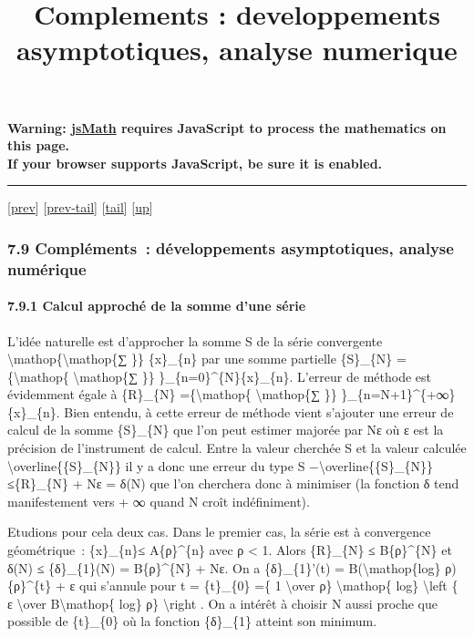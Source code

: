 \documentclass[]{article}
\title{Complements : developpements asymptotiques, analyse numerique}
\author{}
\date{}
\begin{document}
\maketitle

\textbf{Warning: \href{http://www.math.union.edu/locate/jsMath}{jsMath}
requires JavaScript to process the mathematics on this page.\\ If your
browser supports JavaScript, be sure it is enabled.}

\begin{center}\rule{3in}{0.4pt}\end{center}

{[}\href{coursse42.html}{prev}{]}
{[}\href{coursse42.html\#tailcoursse42.html}{prev-tail}{]}
{[}\hyperref[tailcoursse43.html]{tail}{]}
{[}\href{coursch8.html\#coursse43.html}{up}{]}

\subsubsection{7.9 Compléments~: développements asymptotiques, analyse
numérique}

\paragraph{7.9.1 Calcul approché de la somme d'une série}

L'idée naturelle est d'approcher la somme S de la série convergente
\textbackslash{}mathop\{\textbackslash{}mathop\{∑ \}\} \{x\}\_\{n\} par
une somme partielle \{S\}\_\{N\} =\{\textbackslash{}mathop\{
\textbackslash{}mathop\{∑ \}\} \}\_\{n=0\}\^{}\{N\}\{x\}\_\{n\}.
L'erreur de méthode est évidemment égale à \{R\}\_\{N\}
=\{\textbackslash{}mathop\{ \textbackslash{}mathop\{∑ \}\}
\}\_\{n=N+1\}\^{}\{+∞\}\{x\}\_\{n\}. Bien entendu, à cette erreur de
méthode vient s'ajouter une erreur de calcul de la somme \{S\}\_\{N\}
que l'on peut estimer majorée par Nε où ε est la précision de
l'instrument de calcul. Entre la valeur cherchée S et la valeur calculée
\textbackslash{}overline\{\{S\}\_\{N\}\} il y a donc une erreur du type
\textbar{}S
−\textbackslash{}overline\{\{S\}\_\{N\}\}\textbar{}≤\textbar{}\{R\}\_\{N\}\textbar{}
+ Nε = δ(N) que l'on cherchera donc à minimiser (la fonction δ tend
manifestement vers + ∞ quand N croît indéfiniment).

Etudions pour cela deux cas. Dans le premier cas, la série est à
convergence géométrique~: \textbar{}\{x\}\_\{n\}\textbar{}≤
A\{ρ\}\^{}\{n\} avec ρ \textless{} 1. Alors \{R\}\_\{N\} ≤
B\{ρ\}\^{}\{N\} et δ(N) ≤ \{δ\}\_\{1\}(N) = B\{ρ\}\^{}\{N\} + Nε. On a
\{δ\}\_\{1\}'(t) = B(\textbackslash{}mathop\{log\} ρ)\{ρ\}\^{}\{t\} + ε
qui s'annule pour t = \{t\}\_\{0\} =\{ 1 \textbackslash{}over ρ\}
\textbackslash{}mathop\{ log\} \textbackslash{}left \textbar{}\{ ε
\textbackslash{}over B\textbackslash{}mathop\{ log\} ρ\}
\textbackslash{}right \textbar{}. On a intérêt à choisir N aussi proche
que possible de \{t\}\_\{0\} où la fonction \{δ\}\_\{1\} atteint son
minimum.
\end{document}
